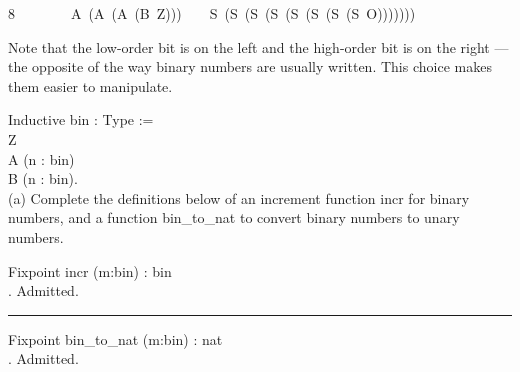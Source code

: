 \documentclass[utf8]{ctexart}
\begin{document}
\hspace*{0.333em}\hspace*{0.333em}\hspace*{0.333em}\hspace*{0.333em}\hspace*{0.333em}\hspace*{0.333em}\hspace*{0.333em}\hspace*{0.333em}\hspace*{0.333em}\hspace*{0.333em}\hspace*{0.333em}8~~~~~~~~{A}~({A}~({A}~({B}~{Z})))~~~~{S}~({S}~({S}~({S}~({S}~({S}~({S}~({S}~{O})))))))

Note that the low-order bit is on the left and the high-order bit is on
the right --- the opposite of the way binary numbers are usually
written. This choice makes them easier to manipulate.

{Inductive} {bin} : {Type} :=\\
\hspace*{0.333em}\hspace*{0.333em}\textbar{} {Z}\\
\hspace*{0.333em}\hspace*{0.333em}\textbar{} {A} ({n} : {bin})\\
\hspace*{0.333em}\hspace*{0.333em}\textbar{} {B} ({n} : {bin}).\\

(a) Complete the definitions below of an increment function {{incr}} for
binary numbers, and a function {{bin\_to\_nat}} to convert binary
numbers to unary numbers.

{Fixpoint} {incr} ({m}:{bin}) : {bin}\\
\hspace*{0.333em}\hspace*{0.333em}{(*~将本行替换成~":=~\_你的\_定义\_~."~*)}.
{Admitted}.\\

\begin{center}\rule{0.5\linewidth}{\linethickness}\end{center}

{Fixpoint} {bin\_to\_nat} ({m}:{bin}) : {nat}\\
\hspace*{0.333em}\hspace*{0.333em}{(*~将本行替换成~":=~\_你的\_定义\_~."~*)}.
{Admitted}.\\
\end{document}
